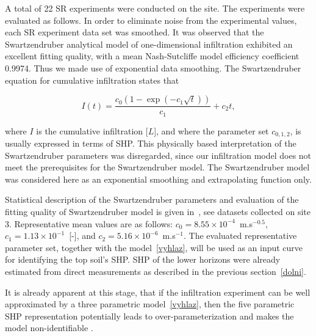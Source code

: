 \documentclass[review]{elsarticle}
\newenvironment{lineq}
    {\begin{linenomath*}
    \begin{equation}
    }
    { 
    \end{equation} 
    \end{linenomath*}
    }
\begin{document}
A total of 22 SR experiments were conducted on the site. The experiments were evaluated as follows. In order to eliminate noise from the experimental values, each SR experiment data set was smoothed. It was observed that the Swartzendruber analytical model \citep{Swartzendruber}
of one-dimensional infiltration exhibited an excellent fitting quality, with a mean  Nash-Sutcliffe model efficiency coefficient  0.9974. Thus we made use of exponential data smoothing. The Swartzendruber equation for cumulative infiltration states that
\begin{lineq}
I(t)=\frac{c_0\left(1-\exp\left(-c_1\sqrt{t}\right)\right)}{c_1}+c_2t,
\label{vyhlaz}
\end{lineq}
where $I$ is the cumulative infiltration [$L$], and where the parameter set $c_{0,1,2}$, is usually expressed in terms of SHP. This physically based interpretation of the Swartzendruber parameters was disregarded, since our infiltration model does not meet the prerequisites for the Swartzendruber model. The Swartzendruber model was considered here as an exponential smoothing and extrapolating function only.


 
Statistical description of the Swartzendruber parameters and evaluation of the fitting quality of Swartzendruber model is given in~\citep{jacka-site}, see datasets collected on site 3. Representative mean values are as follows: $c_0 = 8.55\times 10^{-4}$~m.s$^{-0.5}$, $c_1 = 1.13 \times 10^{-1}$~[-], and $c_2 = 5.16\times 10^{-6}$~m.s$^{-1}$. The evaluated representative  parameter set, together with the model~\eqref{vyhlaz}, will be used as an input curve for identifying the top soil's SHP. SHP of the lower horizons were already estimated from direct measurements as described in the previous section~\ref{dolni}.

It is already apparent at this stage, that if the infiltration experiment can be well approximated by a three parametric model~\eqref{vyhlaz}, then the five parametric SHP representation potentially leads to over-parameterization and makes the model non-identifiable \citep{bellman1970}.  
\end{document}
